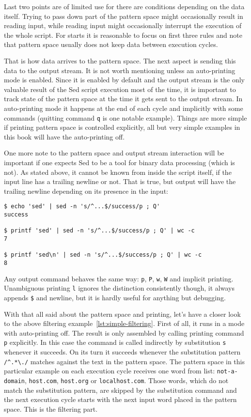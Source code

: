 Last two points are of limited use for there are conditions depending on
the data itself. Trying to pass down part of the pattern space might
occasionally result in reading input, while reading input might occasionally
interrupt the execution of the whole script. For starts it is reasonable to
focus on first three rules and note that pattern space usually does not
keep data between execution cycles.

That is how data arrives to the pattern space. The next aspect is
sending this data to the output stream. It is not worth mentioning
unless an auto-printing mode is enabled.
Since it is enabled by default and the output stream is the
only valuable result of the Sed script execution most of the time,
it is important to track state of the pattern space at the time
it gets sent to the output stream.
In auto-printing mode it happens at the end of each cycle and
implicitly with some commands (quitting command
\lstinline{q} is one notable example).
Things are more simple if printing pattern space is controlled
explicitly, all but very simple examples in this book will have
the auto-printing off.

One more note to the pattern space and output stream interaction
will be important if one expects Sed to be a tool for binary
data processing (which is not). As stated above, it cannot be
known from inside the script itself, if the input line has
a trailing newline or not. That is true, but output will have
the trailing newline depending on its presence in the input:
\begin{lstlisting}
$ echo 'sed' | sed -n 's/^...$/success/p ; Q'    
success

$ printf 'sed' | sed -n 's/^...$/success/p ; Q' | wc -c
7

$ printf 'sed\n' | sed -n 's/^...$/success/p ; Q' | wc -c
8
\end{lstlisting}
Any output command behaves the same way: \lstinline{p},
\lstinline{P}, \lstinline{w}, \lstinline{W} and
implicit printing.
Unambiguous printing \lstinline{l} ignores the distinction
consistently though, it always appends \lstinline{$} and newline,
but it is hardly useful for anything but debugging.

With that all said about the pattern space and printing, let's have
a closer look to the above filtering example~\ref{lst:simple-filtering}.
First of all, it runs in a mode with auto-printing off.
The result is only assembled by calling printing command
\lstinline{p} explicitly. In this case the command is
called indirectly by substitution \lstinline{s} whenever
it succeeds. On its turn it succeeds whenever the
substitution pattern \lstinline{/^.*\./} matches against
the text in the pattern space. The pattern space in this
particular example on each execution cycle receives one
word from list:
\lstinline{not-a-domain}, \lstinline{host.com},
\lstinline{host.org} or \lstinline{localhost.com}.
Those words, which do not match the substitution pattern,
are skipped by the substitution command and the next
execution cycle starts with the next input word placed
in the pattern space. This is the filtering part.

